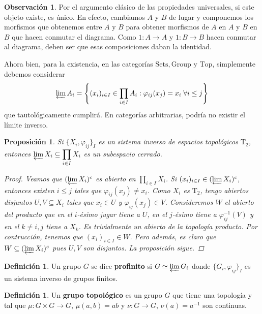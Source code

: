 \documentclass[12pt]{book}
\newtheorem{prop}[teo]{Proposición}
\theoremstyle{definition}
\newtheorem{obs}[teo]{Observación}
\newtheorem{defn}[teo]{Definición}
\begin{document}
\begin{obs}
Por el argumento clásico de las propiedades universales, si este objeto existe, es único. En efecto, cambiamos $A$ y $B$ de lugar y componemos los morfismos que obtenemos entre $A$ y $B$ para obtener morfismos de $A$ en $A$ y $B$ en $B$ que hacen conmutar el diagrama. Como $1:A\to A$ y $1:B\to B$ hacen conmutar al diagrama, deben ser que esas composiciones daban la identidad.

Ahora bien, para la existencia, en las categorías $\mathrm{Sets}, \mathrm{Group}$ y $\mathrm{Top}$, simplemente debemos considerar $$\varprojlim A_i = \left\{(x_i)_{i\in I}\in\displaystyle\prod_{i\in I}A_i : \varphi_{ij}(x_j)=x_i\;\forall i\leq j\right\}$$ que tautológicamente cumplirá. En categorías arbitrarias, podría no existir el límite inverso.
\end{obs}

\begin{prop}
Si $\{X_i,\varphi_{ij}\}_I$ es un sistema inverso de espacios topológicos $\mathrm{T}_2$, entonces $\varprojlim X_i\subseteq\displaystyle\prod_{i\in I} X_i$ es un subespacio cerrado.
\begin{proof}
Veamos que $(\varprojlim X_i)^c$ es abierto en $\displaystyle\prod_{i\in I} X_i$. Si $(x_i)_{i\in I}\in (\varprojlim X_i)^c$, entonces existen $i\leq j$ tales que $\varphi_{ij}(x_j)\neq x_i$. Como $X_i$ es $\mathrm{T}_2$, tengo abiertos disjuntos $U,V\subseteq X_i$ tales que $x_i\in U$ y $\varphi_{ij}(x_j)\in V$. Consideremos $W$ el abierto del producto que en el $i$-ésimo jugar tiene a $U$, en el $j$-ésimo tiene a $\varphi_{ij}^{-1}(V)$ y en el $k\neq i,j$ tiene a $X_k$. Es trivialmente un abierto de la topología producto. Por contrucción, tenemos que $(x_i)_{i\in I}\in W$. Pero además, es claro que $W\subseteq (\varprojlim X_i)^c$ pues $U,V$ son disjuntos. La proposición sigue.
\end{proof}
\end{prop}

\begin{defn}
Un grupo $G$ se dice \textbf{profinito} si $G\simeq\varprojlim G_i$ donde $\{G_i,\varphi_{ij}\}_I$ es un sistema inverso de grupos finitos.
\end{defn}

\begin{defn}
Un \textbf{grupo topológico} es un grupo $G$ que tiene una topología y tal que $\mu:G\times G\to G$, $\mu(a,b)=ab$ y $\nu:G\to G$, $\nu(a)=a^{-1}$ son continuas.
\end{defn}
\end{document}
